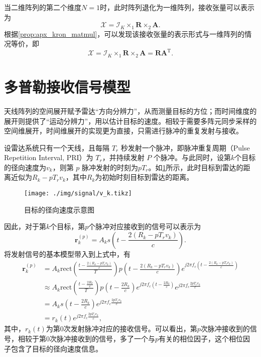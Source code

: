 当二维阵列的第二个维度\( N=1 \)时，此时阵列退化为一维阵列，接收张量可以表示为
\[
    \mathcal{X} = \mathcal{I}_K \times_1 \mathbf{R} \times_2 \mathbf{A}.
\]
根据\cref{prop:apx_kron_matmul}，可以发现该接收张量的表示形式与一维阵列的情况等价，即
\[
    \mathcal{X} = \mathcal{I}_K \times_1 \mathbf{R} \times_2 \mathbf{A} = \mathbf{R} \mathbf{A}^{\mathrm{T}}.
\]

\section{多普勒接收信号模型}
天线阵列的空间展开赋予雷达``方向分辨力''，从而测量目标的方位；而时间维度的展开则提供了``运动分辨力''，用以估计目标的速度。相较于需要多阵元同步采样的空间维展开，时间维展开的实现更为直接，只需进行脉冲的重复发射与接收。

设雷达系统只有一个天线，且每隔 \(T_r\) 秒发射一个脉冲，即脉冲重复周期（Pulse Repetition Interval, PRI）为 \(T_r\)，并持续发射 \(P\) 个脉冲。与此同时，设第\( k \)个目标的径向速度为\( v_k \)，则第 \( p \) 脉冲发射的时刻为\( p T_r \)。如\cref{fig_v_k}所示，此时目标到雷达的距离近似为\( R_k -  p T_r v_k\)，其中\( R_k \)为初始时刻目标到雷达的距离。

\begin{figure}[htb!]
    \centering
    \texttt{[image: ./img/signal/v\_k.tikz]}
    \caption{目标的径向速度示意图}
    \label{fig_v_k}
\end{figure}

因此，对于第\( k \)个目标，第\( p \)个脉冲对应接收到的信号可以表示为
\[
    \bm{r}_k^{(p)} = A_k s\left(t - \frac{2 (R_k - p T_r v_k)}{c}\right).
\]
将发射信号的基本模型带入到上式中，有
\[
    \begin{split}
        \bm{r}_k^{(p)} & = A_k \text{rect}\left(\frac{t - \frac{2 (R_k - p T_r v_k)}{c}}{T}\right) p\left(t - \frac{2 (R_k - p T_r v_k)}{c}\right) e^{j 2 \pi f_c \left(t - \frac{2 (R_k - p T_r v_k)}{c}\right)}   \\
                       & \approx A_k \text{rect}\left(\frac{t - \frac{2 R_k}{c}}{T}\right) p\left(t - \frac{2 R_k}{c}\right) e^{j 2 \pi f_c \left(t - \frac{2 R_k}{c}\right)} e^{j 2 \pi f_c \frac{2 p T_r v_k}{c}} \\
                       & = A_k s\left(t - \frac{2 R_k}{c}\right) e^{j 2 \pi f_c \frac{2 p T_r v_k}{c}}                                                                                                              \\
                       & = r_k(t) e^{j 2 \pi f_c \frac{2 p T_r v_k}{c}},
    \end{split}
\]
其中，\( r_k(t) \)为第0次发射脉冲对应的接收信号。可以看出，第\( p \)次脉冲接收到的信号，相较于第0次脉冲接收到的信号，多了一个与\( p \)有关的相位因子，这个相位因子包含了目标的径向速度信息。

